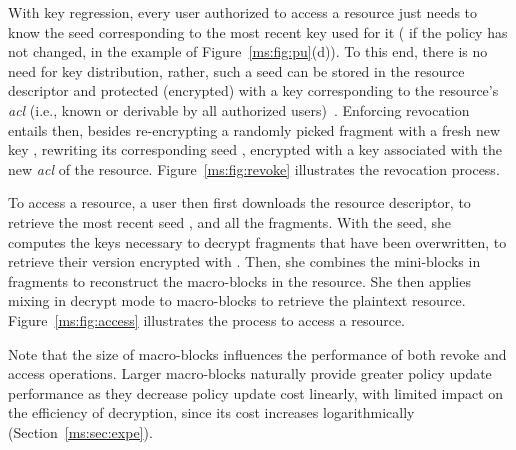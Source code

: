 With key regression, every user authorized to access a resource just needs to know the seed corresponding to the most recent key used for it ( if the policy has not changed,  in the example of Figure~\ref{ms:fig:pu}(d)). To this end, there is no need for key distribution, rather, such a seed can be stored in the resource descriptor and protected (encrypted) with a key corresponding to the resource's {\em acl\/} (i.e., known or derivable by all authorized users)~\cite{afb05,vldb07}. Enforcing revocation entails then, besides re-encrypting a randomly picked fragment with a fresh new key , rewriting its corresponding seed , encrypted with a key associated with the new {\em acl\/} of the resource. Figure~\ref{ms:fig:revoke} illustrates the revocation process.

To access a resource, a user then first downloads the resource descriptor, to retrieve the most recent seed , and all the fragments. With the seed, she computes the keys necessary to decrypt fragments that have been overwritten, to retrieve their version encrypted with . Then, she combines the mini-blocks in fragments to reconstruct the macro-blocks in the resource. She then applies mixing in decrypt mode to macro-blocks to retrieve the plaintext resource. Figure~\ref{ms:fig:access} illustrates the process to access a resource. 

Note that the size of macro-blocks influences the performance of both revoke and access operations. Larger macro-blocks naturally provide greater policy update performance as they decrease policy update cost linearly, with limited impact on the efficiency of decryption, since its cost increases logarithmically (Section~\ref{ms:sec:expe}).
